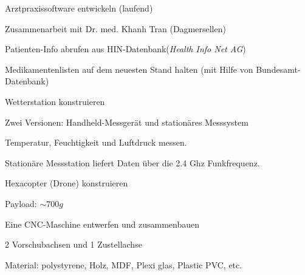 

\begin{cventries}
	
	\cventry
	{} %
	{Arztpraxissoftware entwickeln (laufend)} %
	{} %
	{} %
	{\vspace{-12pt}
		\begin{cvitems} %
			\item {Zusammenarbeit mit Dr. med. Khanh Tran (Dagmersellen)}
			\item {Patienten-Info abrufen aus HIN-Datenbank(\textit{Health Info Net AG})}
			\item {Medikamentenlisten auf dem neuesten Stand halten (mit Hilfe von Bundesamt-Datenbank)}
		\end{cvitems}
	}
	
	\cventry
	{} %
	{Wetterstation konstruieren} %
	{} %
	{} %
	{\vspace{-12pt}
		\begin{cvitems} %
			\item {Zwei Versionen: Handheld-Messgerät und stationäres Messsystem}
			\item {Temperatur, Feuchtigkeit und Luftdruck messen.}
			\item {Stationäre Messstation liefert Daten über die 2.4 Ghz Funkfrequenz.}
		\end{cvitems}
	}
	
	\cventry
	{} %
	{Hexacopter (Drone) konstruieren} %
	{} %
	{} %
	{
		\begin{cvitems} %
			\item {Payload: $ \sim 700g$}
		\end{cvitems}
	}
	
	\cventry
	{} %
	{Eine CNC-Maschine entwerfen und zusammenbauen} %
	{} %
	{} %
	{\vspace{-12pt}
		\begin{cvitems} %
			\item {2 Vorschubachsen und 1 Zustellachse}
			\item {Material: polystyrene, Holz, MDF, Plexi glas, Plastic PVC, etc.}
		\end{cvitems}
	}
	
\end{cventries}